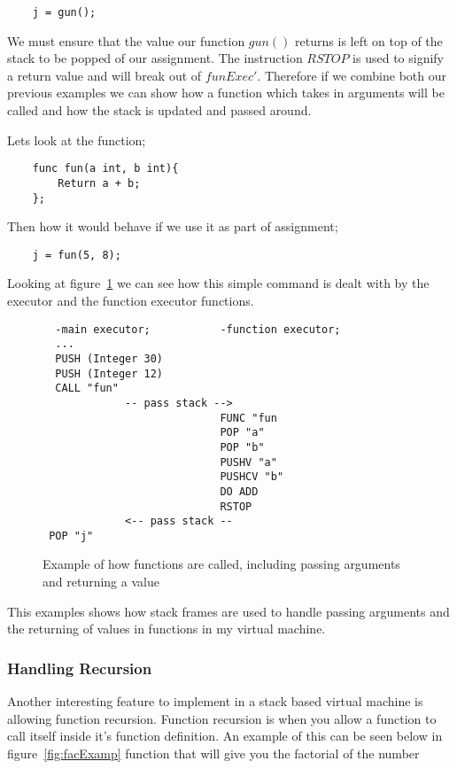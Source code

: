 \begin{lstlisting}
	j = gun();
\end{lstlisting} 

We must ensure that the value our function $gun()$ returns is left on top of the stack to be popped of our assignment. The instruction $RSTOP$ is used to signify a return value and will break out of $funExec'$. Therefore if we combine both our previous examples we can show how a function which takes in arguments will be called and how the stack is updated and passed around.

Lets look at the function;

\begin{lstlisting}
	func fun(a int, b int){
		Return a + b;
	};
\end{lstlisting}

Then how it would behave if we use it as part of assignment;

\begin{lstlisting}
	j = fun(5, 8);
\end{lstlisting}

Looking at figure~\ref{fig:stackFrame} we can see how this simple command is dealt with by the executor and the function executor functions. 

\begin{figure}[h]
\centering
\begin{lstlisting}
  -main executor;           -function executor;
  ...
  PUSH (Integer 30)
  PUSH (Integer 12)
  CALL "fun"
             -- pass stack --> 
                            FUNC "fun  
                            POP "a"
                            POP "b"
                            PUSHV "a"
                            PUSHCV "b"
                            DO ADD
                            RSTOP
             <-- pass stack --
 POP "j"                               
\end{lstlisting}
\caption{Example of how functions are called, including passing arguments and returning a value}
\label{fig:stackFrame}
\end{figure}

This examples shows how stack frames are used to handle passing arguments and the returning of values in functions in my virtual machine.

\subsubsection{Handling Recursion}

Another interesting feature to implement in a stack based virtual machine is allowing function recursion. Function recursion is when you allow a function to call itself inside it's function definition. An example of this can be seen below in figure~\ref{fig:facExamp} function that will give you the factorial of the number  

